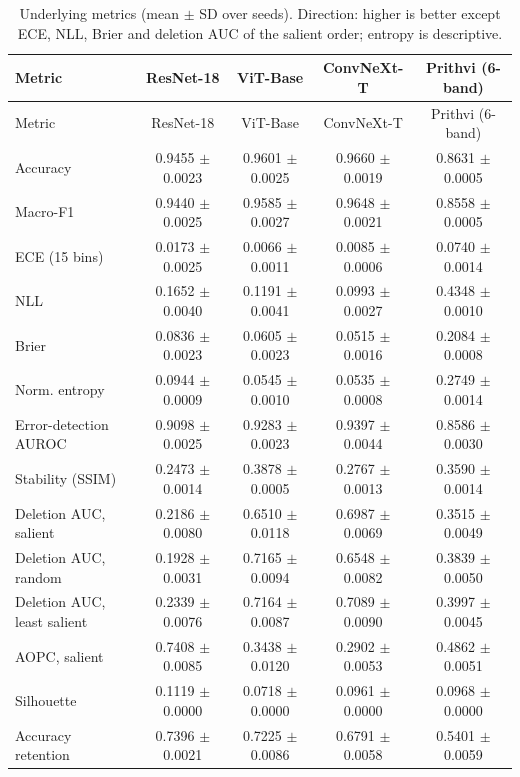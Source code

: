 \begin{longtable}{lcccc}
\caption{Underlying metrics (mean $\pm$ SD over seeds). Direction: higher is better except ECE, NLL, Brier and deletion AUC of the salient order; entropy is descriptive.}\label{tab:metrics}\\
\toprule Metric & ResNet-18 & ViT-Base & ConvNeXt-T & Prithvi (6-band) \\
\midrule\endfirsthead
\toprule Metric & ResNet-18 & ViT-Base & ConvNeXt-T & Prithvi (6-band) \\
\midrule\endhead
Accuracy & 0.9455 $\pm$ 0.0023 & 0.9601 $\pm$ 0.0025 & 0.9660 $\pm$ 0.0019 & 0.8631 $\pm$ 0.0005 \\
Macro-F1 & 0.9440 $\pm$ 0.0025 & 0.9585 $\pm$ 0.0027 & 0.9648 $\pm$ 0.0021 & 0.8558 $\pm$ 0.0005 \\
ECE (15 bins) & 0.0173 $\pm$ 0.0025 & 0.0066 $\pm$ 0.0011 & 0.0085 $\pm$ 0.0006 & 0.0740 $\pm$ 0.0014 \\
NLL & 0.1652 $\pm$ 0.0040 & 0.1191 $\pm$ 0.0041 & 0.0993 $\pm$ 0.0027 & 0.4348 $\pm$ 0.0010 \\
Brier & 0.0836 $\pm$ 0.0023 & 0.0605 $\pm$ 0.0023 & 0.0515 $\pm$ 0.0016 & 0.2084 $\pm$ 0.0008 \\
Norm. entropy & 0.0944 $\pm$ 0.0009 & 0.0545 $\pm$ 0.0010 & 0.0535 $\pm$ 0.0008 & 0.2749 $\pm$ 0.0014 \\
Error-detection AUROC & 0.9098 $\pm$ 0.0025 & 0.9283 $\pm$ 0.0023 & 0.9397 $\pm$ 0.0044 & 0.8586 $\pm$ 0.0030 \\
Stability (SSIM) & 0.2473 $\pm$ 0.0014 & 0.3878 $\pm$ 0.0005 & 0.2767 $\pm$ 0.0013 & 0.3590 $\pm$ 0.0014 \\
Deletion AUC, salient & 0.2186 $\pm$ 0.0080 & 0.6510 $\pm$ 0.0118 & 0.6987 $\pm$ 0.0069 & 0.3515 $\pm$ 0.0049 \\
Deletion AUC, random & 0.1928 $\pm$ 0.0031 & 0.7165 $\pm$ 0.0094 & 0.6548 $\pm$ 0.0082 & 0.3839 $\pm$ 0.0050 \\
Deletion AUC, least salient & 0.2339 $\pm$ 0.0076 & 0.7164 $\pm$ 0.0087 & 0.7089 $\pm$ 0.0090 & 0.3997 $\pm$ 0.0045 \\
AOPC, salient & 0.7408 $\pm$ 0.0085 & 0.3438 $\pm$ 0.0120 & 0.2902 $\pm$ 0.0053 & 0.4862 $\pm$ 0.0051 \\
Silhouette & 0.1119 $\pm$ 0.0000 & 0.0718 $\pm$ 0.0000 & 0.0961 $\pm$ 0.0000 & 0.0968 $\pm$ 0.0000 \\
Accuracy retention & 0.7396 $\pm$ 0.0021 & 0.7225 $\pm$ 0.0086 & 0.6791 $\pm$ 0.0058 & 0.5401 $\pm$ 0.0059 \\
\bottomrule
\end{longtable}
